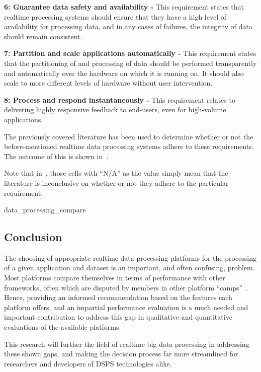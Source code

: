 \noindent \textbf{6: Guarantee data safety and availability -} This requirement states that realtime processing systems
should ensure that they have a high level of availability for processing data, and in any cases of failures, the integrity
of data should remain consistent.

\noindent \textbf{7: Partition and scale applications automatically -} This requirement states that the partitioning of
and processing of data should be performed transparently and automatically over the hardware on which it is running on.
It should also scale to more different levels of hardware without user intervention.

\noindent \textbf{8: Process and respond instantaneously -} This requirement relates to delivering highly responsive
feedback to end-users, even for high-volume applications.

The previously covered literature has been used to determine whether or not the before-mentioned realtime data processing
systems adhere to these requirements. The outcome of this is shown in~.

Note that in~, those cells with ``N/A'' as the value simply mean that the literature
is inconclusive on whether or not they adhere to the particular requirement.

{data_processing_compare}




\subsection{Conclusion} %
\label{sec:conclusion_litrev}

The choosing of appropriate realtime data processing platforms for the processing of a given application and dataset
is an important, and often confusing, problem. Most platforms compare themselves in terms of performance with other
frameworks, often which are disputed by members in other platform ``camps''~\cite{web_slideshare_b,web_slideshare_a}.
Hence, providing an informed recommendation based on the features each platform offers, and an impartial performance
evaluation is a much needed and important contribution to address this gap in qualitative and quantitative evaluations
of the available platforms.

This research will further the field of realtime big data processing in addressing these shown gaps, and making the
decision process far more streamlined for researchers and developers of DSPS technologies alike.


